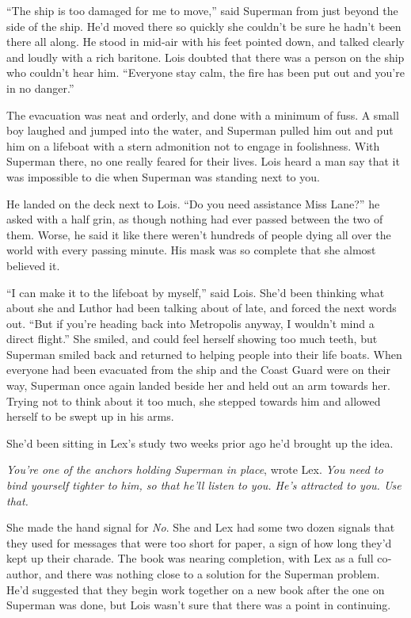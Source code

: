 \documentclass[ebook,12pt]{memoir}
\begin{document}
``The ship is too damaged for me to move,'' said Superman from just
beyond the side of the ship. He'd moved there so quickly she couldn't be
sure he hadn't been there all along. He stood in mid‐air with his feet
pointed down, and talked clearly and loudly with a rich baritone. Lois
doubted that there was a person on the ship who couldn't hear him.
``Everyone stay calm, the fire has been put out and you're in no
danger.''

The evacuation was neat and orderly, and done with a minimum of fuss. A
small boy laughed and jumped into the water, and Superman pulled him out
and put him on a lifeboat with a stern admonition not to engage in
foolishness. With Superman there, no one really feared for their lives.
Lois heard a man say that it was impossible to die when Superman was
standing next to you.

He landed on the deck next to Lois. ``Do you need assistance Miss
Lane?'' he asked with a half grin, as though nothing had ever passed
between the two of them. Worse, he said it like there weren't hundreds
of people dying all over the world with every passing minute. His mask
was so complete that she almost believed it.

``I can make it to the lifeboat by myself,'' said Lois. She'd been
thinking what about she and Luthor had been talking about of late, and
forced the next words out. ``But if you're heading back into Metropolis
anyway, I wouldn't mind a direct flight.'' She smiled, and could feel
herself showing too much teeth, but Superman smiled back and returned to
helping people into their life boats. When everyone had been evacuated
from the ship and the Coast Guard were on their way, Superman once again
landed beside her and held out an arm towards her. Trying not to think
about it too much, she stepped towards him and allowed herself to be
swept up in his arms.

She'd been sitting in Lex's study two weeks prior ago he'd brought up
the idea.

\emph{You're one of the anchors holding Superman in place}, wrote Lex.
\emph{You need to bind yourself tighter to him, so that he'll listen to
you. He's attracted to you. Use that.}

She made the hand signal for \emph{No}. She and Lex had some two dozen
signals that they used for messages that were too short for paper, a
sign of how long they'd kept up their charade. The book was nearing
completion, with Lex as a full co‐author, and there was nothing close to
a solution for the Superman problem. He'd suggested that they begin work
together on a new book after the one on Superman was done, but Lois
wasn't sure that there was a point in continuing.
\end{document}
